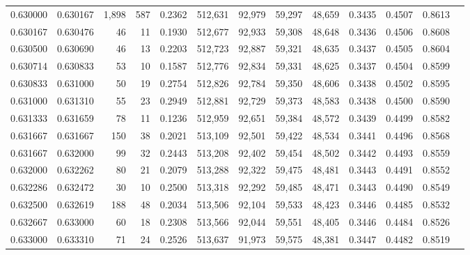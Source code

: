 \begin{tabular}{rrrrrrrrrrrrr}
0.630000 & 0.630167 & 1,898 & 587 &                                     0.2362 & 512,631 &  92,979 &  59,297 &  48,659 & 0.3435 & 0.4507 & 0.8613 \\
0.630167 & 0.630476 &    46 &  11 &                                     0.1930 & 512,677 &  92,933 &  59,308 &  48,648 & 0.3436 & 0.4506 & 0.8608 \\
0.630500 & 0.630690 &    46 &  13 &                                     0.2203 & 512,723 &  92,887 &  59,321 &  48,635 & 0.3437 & 0.4505 & 0.8604 \\
0.630714 & 0.630833 &    53 &  10 &                                     0.1587 & 512,776 &  92,834 &  59,331 &  48,625 & 0.3437 & 0.4504 & 0.8599 \\
0.630833 & 0.631000 &    50 &  19 &                                     0.2754 & 512,826 &  92,784 &  59,350 &  48,606 & 0.3438 & 0.4502 & 0.8595 \\
0.631000 & 0.631310 &    55 &  23 &                                     0.2949 & 512,881 &  92,729 &  59,373 &  48,583 & 0.3438 & 0.4500 & 0.8590 \\
0.631333 & 0.631659 &    78 &  11 &                                     0.1236 & 512,959 &  92,651 &  59,384 &  48,572 & 0.3439 & 0.4499 & 0.8582 \\
0.631667 & 0.631667 &   150 &  38 &                                     0.2021 & 513,109 &  92,501 &  59,422 &  48,534 & 0.3441 & 0.4496 & 0.8568 \\
0.631667 & 0.632000 &    99 &  32 &                                     0.2443 & 513,208 &  92,402 &  59,454 &  48,502 & 0.3442 & 0.4493 & 0.8559 \\
0.632000 & 0.632262 &    80 &  21 &                                     0.2079 & 513,288 &  92,322 &  59,475 &  48,481 & 0.3443 & 0.4491 & 0.8552 \\
0.632286 & 0.632472 &    30 &  10 &                                     0.2500 & 513,318 &  92,292 &  59,485 &  48,471 & 0.3443 & 0.4490 & 0.8549 \\
0.632500 & 0.632619 &   188 &  48 &                                     0.2034 & 513,506 &  92,104 &  59,533 &  48,423 & 0.3446 & 0.4485 & 0.8532 \\
0.632667 & 0.633000 &    60 &  18 &                                     0.2308 & 513,566 &  92,044 &  59,551 &  48,405 & 0.3446 & 0.4484 & 0.8526 \\
0.633000 & 0.633310 &    71 &  24 &                                     0.2526 & 513,637 &  91,973 &  59,575 &  48,381 & 0.3447 & 0.4482 & 0.8519 \\

\end{tabular}
